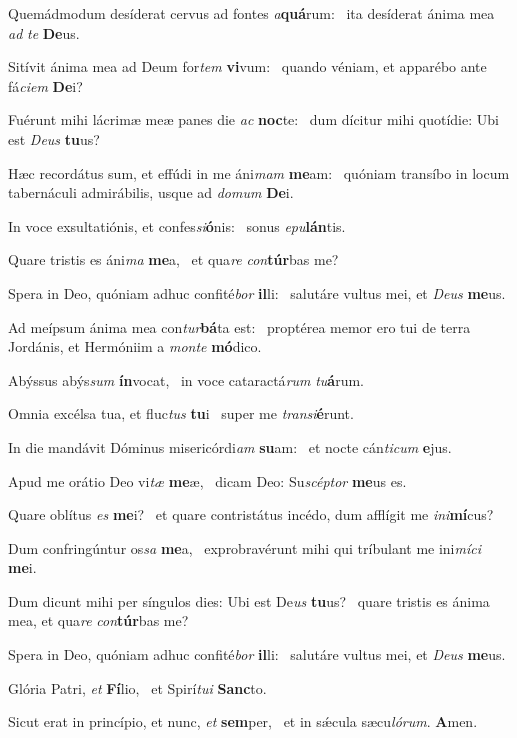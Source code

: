 \item Quemádmodum desíderat cervus ad fontes \textit{a}\textbf{quá}rum:~\psstar{} ita desíderat ánima mea \textit{ad} \textit{te} \textbf{De}us.
\item Sitívit ánima mea ad Deum for\textit{tem} \textbf{vi}vum:~\psstar{} quando véniam, et apparébo ante fá\textit{ciem} \textbf{De}i?
\item Fuérunt mihi lácrimæ meæ panes die \textit{ac} \textbf{noc}te:~\psstar{} dum dícitur mihi quotídie: Ubi est \textit{Deus} \textbf{tu}us?
\item Hæc recordátus sum, et effúdi in me áni\textit{mam} \textbf{me}am:~\psstar{} quóniam transíbo in locum tabernáculi admirábilis, usque ad \textit{domum} \textbf{De}i.
\item In voce exsultatiónis, et confes\textit{si}\textbf{ó}nis:~\psstar{} sonus \textit{epu}\textbf{lán}tis.
\item Quare tristis es áni\textit{ma} \textbf{me}a,~\psstar{} et qua\textit{re} \textit{con}\textbf{túr}bas me?
\item Spera in Deo, quóniam adhuc confité\textit{bor} \textbf{il}li:~\psstar{} salutáre vultus mei, et \textit{Deus} \textbf{me}us.
\item Ad meípsum ánima mea con\textit{tur}\textbf{bá}ta est:~\psstar{} proptérea memor ero tui de terra Jordánis, et Hermóniim a \textit{monte} \textbf{mó}dico.
\item Abýssus abýs\textit{sum} \textbf{ín}vocat,~\psstar{} in voce cataractá\textit{rum} \textit{tu}\textbf{á}rum.
\item Omnia excélsa tua, et fluc\textit{tus} \textbf{tu}i~\psstar{} super me \textit{transi}\textbf{é}runt.
\item In die mandávit Dóminus misericórdi\textit{am} \textbf{su}am:~\psstar{} et nocte cán\textit{ticum} \textbf{e}jus.
\item Apud me orátio Deo vi\textit{tæ} \textbf{me}æ,~\psstar{} dicam Deo: Su\textit{scéptor} \textbf{me}us es.
\item Quare oblítus \textit{es} \textbf{me}i?~\psstar{} et quare contristátus incédo, dum afflígit me \textit{ini}\textbf{mí}cus?
\item Dum confringúntur os\textit{sa} \textbf{me}a,~\psstar{} exprobravérunt mihi qui tríbulant me ini\textit{míci} \textbf{me}i.
\item Dum dicunt mihi per síngulos dies: Ubi est De\textit{us} \textbf{tu}us?~\psstar{} quare tristis es ánima mea, et qua\textit{re} \textit{con}\textbf{túr}bas me?
\item Spera in Deo, quóniam adhuc confité\textit{bor} \textbf{il}li:~\psstar{} salutáre vultus mei, et \textit{Deus} \textbf{me}us.
\item Glória Patri, \textit{et} \textbf{Fí}lio,~\psstar{} et Spirí\textit{tui} \textbf{Sanc}to.
\item Sicut erat in princípio, et nunc, \textit{et} \textbf{sem}per,~\psstar{} et in sǽcula sæcu\textit{lórum}. \textbf{A}men.
